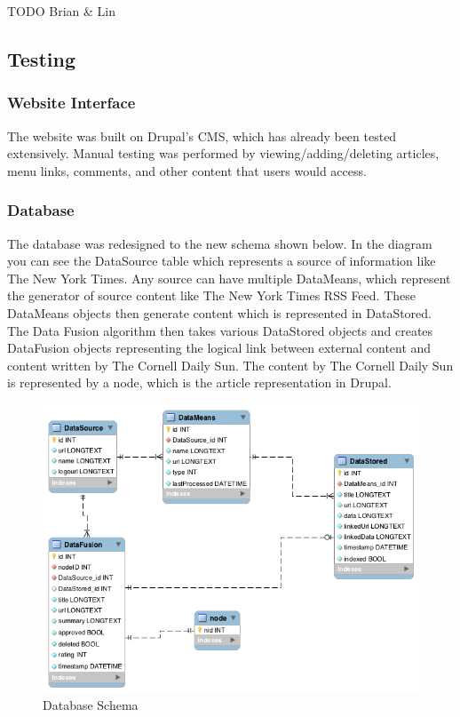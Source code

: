 \documentclass[11pt]{article} %
\begin{document}
TODO Brian \& Lin

\subsection{Testing}

\subsubsection{Website Interface}

The website was built on Drupal’s CMS, which has already been tested extensively. Manual testing was performed by viewing/adding/deleting articles, menu links, comments, and other content that users would access.

\subsubsection{Database}

The database was redesigned to the new schema shown below. In the diagram you can see the DataSource table which represents a source of information like The New York Times. Any source can have multiple DataMeans, which represent the generator of source content like The New York Times RSS Feed. These DataMeans objects then generate content which is represented in DataStored. The Data Fusion algorithm then takes various DataStored objects and creates DataFusion objects representing the logical link between external content and content written by The Cornell Daily Sun. The content by The Cornell Daily Sun is represented by a node, which is the article representation in Drupal.

\begin{figure}[htbp]
\begin{center}
\includegraphics[width=\columnwidth]{images/database_schema}
\caption{Database Schema}
\end{center}
\end{figure}
\end{document}
